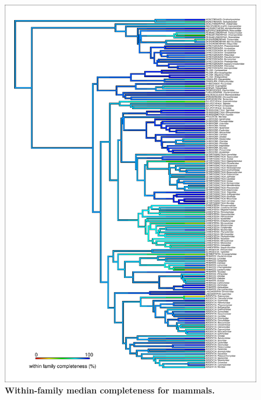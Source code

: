 \documentclass[11pt]{article}
\begin{document}
\begin{figure}[h!]
\centering
\includegraphics[scale=0.55]{figures/NA_phylo_patterns/Mammals_completeness}
\caption[Within-family median completeness for mammals]{\textbf{Within-family median completeness for mammals.}}
\label{}
\end{figure}
\end{document}
